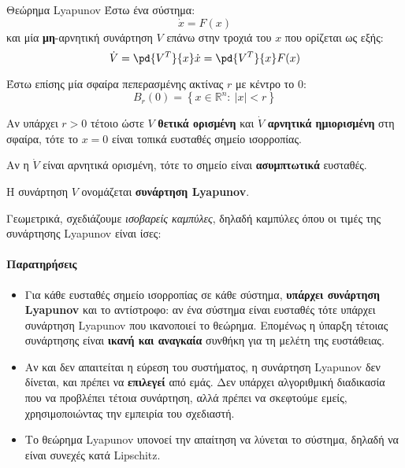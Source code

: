 \documentclass[11pt,a4paper,notitlepage,fleqn]{article}
\let\mytodo\todo
\renewcommand{\todo}[1]{\par\mytodo[inline,noline]{#1}}
\begin{document}
\begin{theorem}{Θεώρημα Lyapunov}{}
	Έστω ένα σύστημα: \[
	\dot x = F(x)
	\]
	και μία \textbf{μη}-αρνητική συνάρτηση \( V \) επάνω στην τροχιά του \( x \) που ορίζεται ως
	εξής:
	\[
	\dot V = \pd{V^T}{x} \dot x = \pd{V^T}{x} F(x)
	\]

	Έστω επίσης μία σφαίρα πεπερασμένης ακτίνας \( r \) με
	κέντρο το \(0\):
	\[
	B_r(0) = \left\lbrace x\in \mathbb R^n :\ |x|<r \right\rbrace
	\]

	Αν υπάρχει \( r > 0 \) τέτοιο ώστε \( V \) \textbf{θετικά ορισμένη}
	και \( \dot V \) \textbf{αρνητικά ημιορισμένη} στη σφαίρα, τότε το \( x = 0 \) είναι τοπικά
	ευσταθές σημείο ισορροπίας.

	Αν η \( \dot V \) είναι αρνητικά ορισμένη, τότε το σημείο είναι \textbf{ασυμπτωτικά} ευσταθές.

	Η συνάρτηση \( V \) ονομάζεται \textbf{συνάρτηση Lyapunov}.
\end{theorem}

Γεωμετρικά, σχεδιάζουμε \textit{ισοβαρείς καμπύλες}, δηλαδή καμπύλες όπου
οι τιμές της συνάρτησης Lyapunov είναι ίσες:
\todo{Graph 18}

\paragraph{Παρατηρήσεις}
\begin{itemize}
	\item Για κάθε ευσταθές σημείο ισορροπίας σε κάθε σύστημα, \textbf{υπάρχει
		συνάρτηση Lyapunov} και το αντίστροφο: αν ένα σύστημα είναι ευσταθές τότε υπάρχει συνάρτηση Lyapunov που ικανοποιεί το θεώρημα. Επομένως η ύπαρξη τέτοιας συνάρτησης είναι
	\textbf{ικανή και αναγκαία} συνθήκη για τη μελέτη της ευστάθειας.
	\item Αν και δεν απαιτείται η εύρεση του συστήματος, η συνάρτηση
	Lyapunov δεν δίνεται, και πρέπει να \textbf{επιλεγεί} από εμάς. Δεν υπάρχει
	αλγοριθμική διαδικασία που να προβλέπει τέτοια συνάρτηση, αλλά πρέπει να
	σκεφτούμε εμείς, χρησιμοποιώντας την εμπειρία του σχεδιαστή.
	\item Το θεώρημα Lyapunov υπονοεί την απαίτηση να λύνεται
	το σύστημα, δηλαδή να είναι συνεχές κατά Lipschitz.
\end{itemize}

\end{document}
